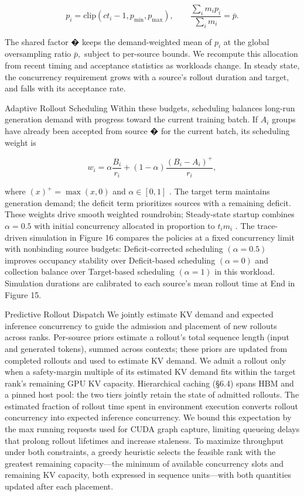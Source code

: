 \documentclass[
  10
]{article}
\begin{document}
\[
p _ { i } = \mathrm { c l i p } ( c t _ { i } - 1 , p _ { \mathrm { m i n } } , p _ { \mathrm { m a x } } ) , \qquad \frac { \sum _ { i } m _ { i } p _ { i } } { \sum _ { i } m _ { i } } = \bar { p } .\tag{6}
\]

The shared factor � keeps the demand-weighted mean of \(p _ { i }\) at
the global oversampling ratio \({ \bar { p } } ,\) subject to per-source
bounds. We recompute this allocation from recent timing and acceptance
statistics as workloads change. In steady state, the concurrency
requirement grows with a source's rollout duration and target, and falls
with its acceptance rate.

Adaptive Rollout Scheduling Within these budgets, scheduling balances
long-run generation demand with progress toward the current training
batch. If \(A _ { i }\) groups have already been accepted from source �
for the current batch, its scheduling weight is

\[
w _ { i } = \alpha \frac { B _ { i } } { r _ { i } } + ( 1 - \alpha ) \frac { ( B _ { i } - A _ { i } ) ^ { + } } { r _ { i } } ,\tag{7}
\]

where \(( x ) ^ { + } = \operatorname* { m a x } ( x , 0 )\) and
\(\alpha \in [ 0 , 1 ]\) . The target term maintains generation demand;
the deficit term prioritizes sources with a remaining deficit. These
weights drive smooth weighted roundrobin; Steady-state startup combines
\(\alpha = 0 . 5\) with initial concurrency allocated in proportion to
\(t _ { i } m _ { i }\) . The trace-driven simulation in Figure 16
compares the policies at a fixed concurrency limit with nonbinding
source budgets: Deficit-corrected scheduling \(( \alpha = 0 . 5 )\)
improves occupancy stability over Deficit-based scheduling
\(\left( \alpha = 0 \right)\) and collection balance over Target-based
scheduling \(( \alpha = 1 )\) in this workload. Simulation durations are
calibrated to each source's mean rollout time at End in Figure 15.

Predictive Rollout Dispatch We jointly estimate KV demand and expected
inference concurrency to guide the admission and placement of new
rollouts across ranks. Per-source priors estimate a rollout's total
sequence length (input and generated tokens), summed across contexts;
these priors are updated from completed rollouts and used to estimate KV
demand. We admit a rollout only when a safety-margin multiple of its
estimated KV demand fits within the target rank's remaining GPU KV
capacity. Hierarchical caching (§6.4) spans HBM and a pinned host pool:
the two tiers jointly retain the state of admitted rollouts. The
estimated fraction of rollout time spent in environment execution
converts rollout concurrency into expected inference concurrency. We
bound this expectation by the max running requests used for CUDA graph
capture, limiting queueing delays that prolong rollout lifetimes and
increase staleness. To maximize throughput under both constraints, a
greedy heuristic selects the feasible rank with the greatest remaining
capacity---the minimum of available concurrency slots and remaining KV
capacity, both expressed in sequence units---with both quantities
updated after each placement.
\end{document}
